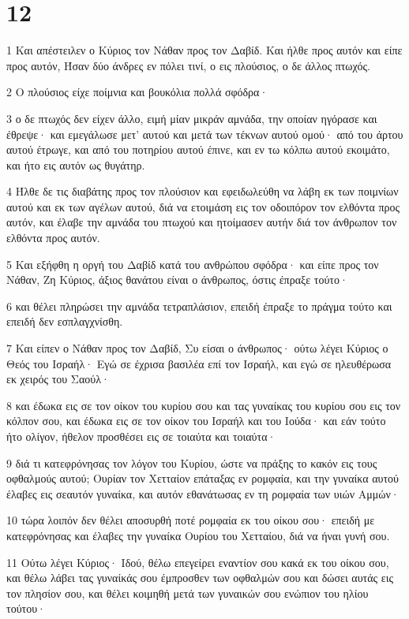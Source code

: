 \chapter{12}

\par 1 Και απέστειλεν ο Κύριος τον Νάθαν προς τον Δαβίδ. Και ήλθε προς αυτόν και είπε προς αυτόν, Ήσαν δύο άνδρες εν πόλει τινί, ο εις πλούσιος, ο δε άλλος πτωχός.
\par 2 Ο πλούσιος είχε ποίμνια και βουκόλια πολλά σφόδρα·
\par 3 ο δε πτωχός δεν είχεν άλλο, ειμή μίαν μικράν αμνάδα, την οποίαν ηγόρασε και έθρεψε· και εμεγάλωσε μετ' αυτού και μετά των τέκνων αυτού ομού· από του άρτου αυτού έτρωγε, και από του ποτηρίου αυτού έπινε, και εν τω κόλπω αυτού εκοιμάτο, και ήτο εις αυτόν ως θυγάτηρ.
\par 4 Ήλθε δε τις διαβάτης προς τον πλούσιον και εφειδωλεύθη να λάβη εκ των ποιμνίων αυτού και εκ των αγέλων αυτού, διά να ετοιμάση εις τον οδοιπόρον τον ελθόντα προς αυτόν, και έλαβε την αμνάδα του πτωχού και ητοίμασεν αυτήν διά τον άνθρωπον τον ελθόντα προς αυτόν.
\par 5 Και εξήφθη η οργή του Δαβίδ κατά του ανθρώπου σφόδρα· και είπε προς τον Νάθαν, Ζη Κύριος, άξιος θανάτου είναι ο άνθρωπος, όστις έπραξε τούτο·
\par 6 και θέλει πληρώσει την αμνάδα τετραπλάσιον, επειδή έπραξε το πράγμα τούτο και επειδή δεν εσπλαγχνίσθη.
\par 7 Και είπεν ο Νάθαν προς τον Δαβίδ, Συ είσαι ο άνθρωπος· ούτω λέγει Κύριος ο Θεός του Ισραήλ· Εγώ σε έχρισα βασιλέα επί τον Ισραήλ, και εγώ σε ηλευθέρωσα εκ χειρός του Σαούλ·
\par 8 και έδωκα εις σε τον οίκον του κυρίου σου και τας γυναίκας του κυρίου σου εις τον κόλπον σου, και έδωκα εις σε τον οίκον του Ισραήλ και του Ιούδα· και εάν τούτο ήτο ολίγον, ήθελον προσθέσει εις σε τοιαύτα και τοιαύτα·
\par 9 διά τι κατεφρόνησας τον λόγον του Κυρίου, ώστε να πράξης το κακόν εις τους οφθαλμούς αυτού; Ουρίαν τον Χετταίον επάταξας εν ρομφαία, και την γυναίκα αυτού έλαβες εις σεαυτόν γυναίκα, και αυτόν εθανάτωσας εν τη ρομφαία των υιών Αμμών·
\par 10 τώρα λοιπόν δεν θέλει αποσυρθή ποτέ ρομφαία εκ του οίκου σου· επειδή με κατεφρόνησας και έλαβες την γυναίκα Ουρίου του Χετταίου, διά να ήναι γυνή σου.
\par 11 Ούτω λέγει Κύριος· Ιδού, θέλω επεγείρει εναντίον σου κακά εκ του οίκου σου, και θέλω λάβει τας γυναίκάς σου έμπροσθεν των οφθαλμών σου και δώσει αυτάς εις τον πλησίον σου, και θέλει κοιμηθή μετά των γυναικών σου ενώπιον του ηλίου τούτου·
